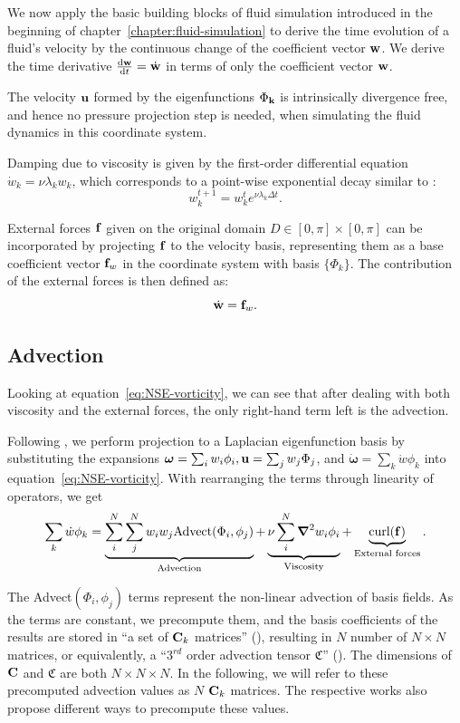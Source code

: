 We now apply the basic building blocks of fluid simulation introduced in the
beginning of chapter~\ref{chapter:fluid-simulation} to derive the time evolution
of a fluid's velocity by the continuous change of the coefficient vector
$\vb{w}$. We derive the time derivative $\dv{\vb{w}}{t} = \dot{\vb{w}}$ in terms of
only the coefficient vector $\vb{w}$.

The velocity $\vb{u}$ formed by the eigenfunctions $\Phi_{\vb{k}}$ is
intrinsically divergence free, and hence no pressure projection step is needed,
when simulating the fluid dynamics in this coordinate system.

Damping due to viscosity is given by the first-order differential equation
$\dot{w}_k = \nu \lambda_k w_k$, which corresponds to a point-wise exponential
decay similar to \cite{StableFluids}: $$w_k^{t+1} = w_k^t e^{\nu \lambda_k
\Delta t}.$$

External forces $\vb{f}$ given on the original domain $D \in [0,\pi]\times [0,
\pi]$ can be incorporated by projecting $\vb{f}$ to the velocity basis,
representing them as a base coefficient vector $\vb{f}_w$ in the coordinate
system with basis $\{\Phi_k\}$. The contribution of the external forces is then
defined as:
$$\dot{\vb{w}} = \vb{f}_w.$$

\subsection*{Advection}
Looking at equation~\eqref{eq:NSE-vorticity}, we can see that after dealing with
both viscosity and the external forces, the only right-hand term left is the
advection.

Following \citet{dewitt}, we perform projection to a Laplacian eigenfunction
basis by substituting the expansions $\boldsymbol{\omega} = \sum_i w_i \phi_i,
\vb{u} = \sum_j w_j\Phi_j$, and $\dot{\boldsymbol{\omega}}
= \sum_k\dot{w}\phi_k$ into equation~\eqref{eq:NSE-vorticity}. With rearranging
the terms through linearity of operators, we get
\begin{equation}
    \sum_k\dot{w}\phi_k
    = \underbrace{\sum_i^N \sum_j^N w_i w_j \text{Advect}(\Phi_i, \phi_j)}_{
        \text{Advection}
    }
    + \underbrace{\nu \sum_i^N \grad^2 w_i \phi_i}_{\text{Viscosity}}
    + \underbrace{\text{curl}(\vb{f})}_{\text{External forces}}.
\end{equation}

The Advect$(\Phi_i, \phi_j)$ terms represent the non-linear advection of basis
fields. As the terms are constant, we precompute them, and the basis coefficients
of the results are stored in ``a set of $\vb{C}_k$ matrices'' (\citet{dewitt}),
resulting in $N$ number of $N \times N$ matrices, or equivalently, a ``$3^{rd}$
order advection tensor $\mathfrak{C}$'' (\citet{scalable-eigenfluids}).  The
dimensions of $\vb{C}$ and $\mathfrak{C}$ are both $N \times N \times N$. In the
following, we will refer to these precomputed advection values as $N$ $\vb{C}_k$
matrices.  The respective works also propose different ways to precompute these
values.

